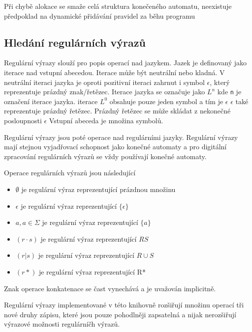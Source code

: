 Při chybě alokace se smaže celá struktura konečeného automatu, neexistuje předpoklad na dynamické přidávání pravidel za běhu programu

\subsection{Hledání regulárních výrazů}

Regulární výrazy slouží pro popis operací nad jazykem.
Jazek je definovaný jako iterace nad vstupní abecedou.
Iterace může  být neutrální nebo kladná.
V neutrální iteraci jazyka je oproti pozitivní iteraci zahrnut i symbol $\epsilon$,
který reprezentuje prázdný znak/řetězec.
Iterace jazyka se označuje jako $L^n$ kde \texttt{n} je označení iterace jazyka.
iterace $L^0$ obsahuje pouze jeden symbol a tím je $\epsilon$
$\epsilon$ také reprezentuje prázdný řetězec. Prázdný řetězec se může skládat z nekonečné posloupnosti $\epsilon$
Vstupní abeceda je množina symbolů.

Regulární výrazy jsou poté operace nad regulárními jazyky.
Regulární výrazy mají stejnou  vyjadřovací schopnost jako konečné automaty a pro digitální zpracování
regulárních výrazů se vždy používají konečné automaty.

Operace regulárních výrazů jsou následující

\begin{itemize}
	\item{$\emptyset$ je regulární výraz reprezentující prázdnou množinu}
	\item{$\epsilon$ je regulární výraz reprezentující $\{\epsilon\}$}
	\item{$a, a \in \Sigma$ je regulární výraz reprezentující $\{a\}$}
	\item{$(r \cdot s)$ je regulární výraz reprezentující $RS$}
	\item{$(r | s)$ je regulární výraz reprezentující $R \cup S$}
	\item{$(r*)$ je regulární výraz reprezentující R*}
\end{itemize}

Znak operace konkatenace %
se čast vynechává a je uvažován implicitně.

Regulární výrazy implementované v této knihovně rozšiřují množinu operací tři nové druhy zápisu,
které jsou pouze pohodlněji zapsatelná a nijak nerozšiřují výrazové možnosti regulárníčh výrazů.

